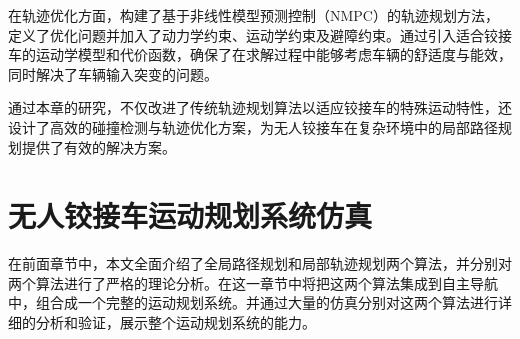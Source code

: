 \documentclass[master,academic]{ysuthesis} %
\begin{document}
	在轨迹优化方面，构建了基于非线性模型预测控制（NMPC）的轨迹规划方法，定义了优化问题并加入了动力学约束、运动学约束及避障约束。通过引入适合铰接车的运动学模型和代价函数，确保了在求解过程中能够考虑车辆的舒适度与能效，同时解决了车辆输入突变的问题。

	通过本章的研究，不仅改进了传统轨迹规划算法以适应铰接车的特殊运动特性，还设计了高效的碰撞检测与轨迹优化方案，为无人铰接车在复杂环境中的局部路径规划提供了有效的解决方案。
	
	\chapter{无人铰接车运动规划系统仿真}
	在前面章节中，本文全面介绍了全局路径规划和局部轨迹规划两个算法，并分别对两个算法进行了严格的理论分析。在这一章节中将把这两个算法集成到自主导航中，组合成一个完整的运动规划系统。并通过大量的仿真分别对这两个算法进行详细的分析和验证，展示整个运动规划系统的能力。
	
\end{document}
